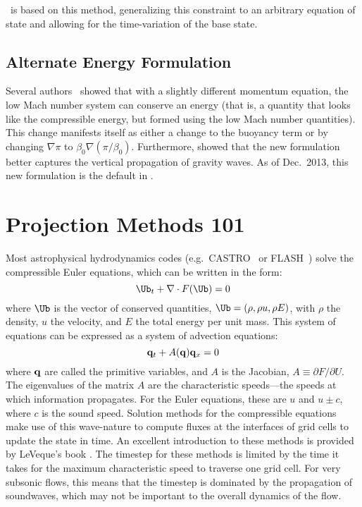 \maestro\ is based on this method, generalizing this constraint to an
arbitrary equation of state and allowing for the time-variation of the
base state.

\subsection{Alternate Energy Formulation}

Several authors~\cite{KP:2012,VLBWZ:2013} showed that with a slightly
different momentum equation, the low Mach number system can conserve
an energy (that is, a quantity that looks like the compressible
energy, but formed using the low Mach number quantities).  This change
manifests itself as either a change to the buoyancy term or by
changing $\nabla \pi$ to $\beta_0 \nabla (\pi/\beta_0)$.  Furthermore,
\cite{VLBWZ:2013} showed that the new formulation better captures the
vertical propagation of gravity waves.  As of
Dec.\ 2013, this new formulation is the default in \maestro.

\section{Projection Methods 101}

Most astrophysical hydrodynamics codes
(e.g.\ CASTRO~\cite{castro} or FLASH~\cite{flash}) solve the
compressible Euler equations, which can be written in the form:
\begin{equation}
\Ub_t + \nabla \cdot F(\Ub) = 0
\end{equation}
where $\Ub$ is the vector of conserved quantities, $\Ub = (\rho, \rho u,
\rho E)$, with $\rho$ the density, $u$ the velocity, and $E$ the total
energy per unit mass.  This system of equations can be expressed 
as a system of advection equations:
\begin{equation}
{\bf q}_t + A({\bf q}) {\bf q}_x = 0
\end{equation}
where ${\bf q}$ are called the primitive variables, and $A$ is the
Jacobian, $A \equiv \partial F / \partial U$.  The eigenvalues of the
matrix $A$ are the characteristic speeds---the speeds at which
information propagates.  For the Euler equations, these are $u$ and $u
\pm c$, where $c$ is the sound speed.  Solution methods for the
compressible equations make use of this wave-nature to compute fluxes
at the interfaces of grid cells to update the state in time.  An
excellent introduction to these methods is provided by LeVeque's book
\cite{leveque}.  The timestep for these methods is limited by the time
it takes for the maximum characteristic speed to traverse one grid cell.
For very subsonic flows, this means that the timestep is dominated by
the propagation of soundwaves, which may not be important to the
overall dynamics of the flow.


